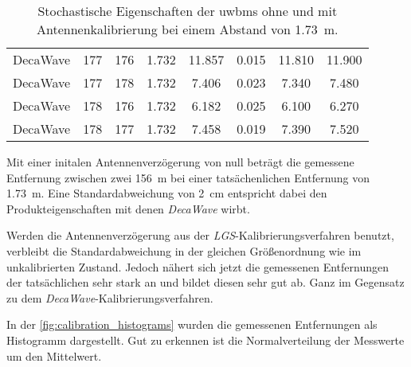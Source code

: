 \begin{table}
\begin{tabular}{||c||cc||ccc|cc||}
DecaWave & 177 & 176 & \num{1.732} & \num{11.857} & \num{0.015} & \num{11.810} & \num{11.900} \\
DecaWave & 177 & 178 & \num{1.732} & \num{7.406} & \num{0.023} & \num{7.340} & \num{7.480} \\
DecaWave & 178 & 176 & \num{1.732} & \num{6.182} & \num{0.025} & \num{6.100} & \num{6.270} \\
DecaWave & 178 & 177 & \num{1.732} & \num{7.458} & \num{0.019} & \num{7.390} & \num{7.520} \\
\hline
	\end{tabular}
	\caption[Stochastische Eigenschaften der \Glspl{uwbm} ohne und mit Antennenkalibrierung bei einem Abstand von \SI{1.73}{\meter}.]{Stochastische Eigenschaften der \Glspl{uwbm} ohne und mit Antennenkalibrierung bei einem Abstand von \SI{1.73}{\meter}.}
	\label{tab:calibration_range_results}
\end{table}


Mit einer initalen Antennenverzögerung von null beträgt die gemessene Entfernung zwischen zwei  \approx \SI{156}{\meter} bei einer tatsächenlichen Entfernung von \approx \SI{1.73}{\meter}. Eine Standardabweichung von \approx \SI{2}{\centi\meter} entspricht dabei den Produkteigenschaften mit denen \textit{DecaWave} wirbt.

Werden die Antennenverzögerung aus der \textit{LGS}-Kalibrierungsverfahren benutzt, verbleibt die Standardabweichung in der gleichen Größenordnung wie im unkalibrierten Zustand. Jedoch nähert sich jetzt die gemessenen Entfernungen der tatsächlichen sehr stark an und bildet diesen sehr gut ab. Ganz im Gegensatz zu dem \textit{DecaWave}-Ka\-li\-brierungs\-ver\-fahren.


In der \autoref{fig:calibration_histograms} wurden die gemessenen Entfernungen als Histogramm dargestellt. Gut zu erkennen ist die Normalverteilung der Messwerte um den Mittelwert.

